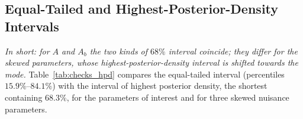 \subsection{Equal-Tailed and Highest-Posterior-Density Intervals}
\label{sec:checks_hpd}
\emph{In short: for $A$ and $A_b$ the two kinds of $68\%$ interval coincide; they differ for the skewed parameters, whose highest-posterior-density interval is shifted towards the mode.}
Table~\ref{tab:checks_hpd} compares the equal-tailed interval (percentiles $15.9\%$--$84.1\%$) with the interval of highest posterior density, the shortest containing $68.3\%$, for the parameters of interest and for three skewed nuisance parameters.

\begin{table}[h]
\centering
{}
\caption{Equal-tailed and highest-posterior-density $68\%$ intervals and skewness of the marginal posteriors.}
\label{tab:checks_hpd}
\end{table}


